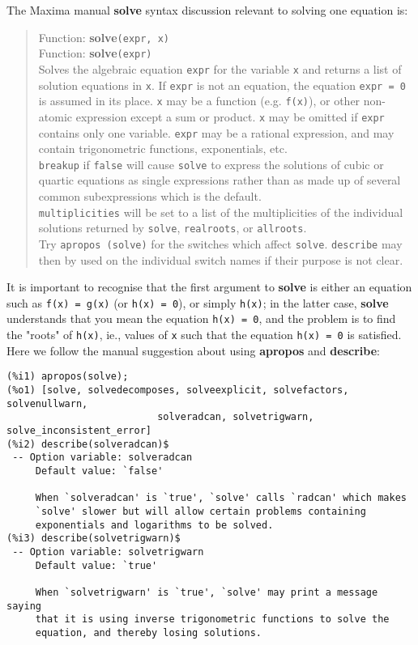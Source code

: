\documentclass[12pt]{article}
\begin{document}
The Maxima manual \textbf{solve} syntax discussion relevant to solving one equation is:
\small
\begin{quote}
Function: \textbf{solve}\verb|(expr, x) |\\
Function: \textbf{solve}\verb|(expr) |\\
Solves the algebraic equation \verb|expr| for the variable \verb|x| and returns a
  list of solution equations in \verb|x|.
If \verb|expr| is not an equation, the equation \verb|expr = 0| is assumed in
  its place.
\verb|x| may be a function (e.g. \verb|f(x)|), or other non-atomic expression
  except a sum or product.
\verb|x| may be omitted if \verb|expr| contains only one variable.
\verb|expr| may be a rational expression, and may contain trigonometric functions,
 exponentials, etc.\\
\verb|breakup| if \verb|false| will cause \verb|solve| to express the solutions
   of cubic or quartic equations as single expressions rather than as made up
   of several common subexpressions which is the default. \\
\verb|multiplicities| will be set to a list of the multiplicities of the
   individual solutions returned by \verb|solve|, \verb|realroots|, or \verb|allroots|.\\
Try \verb|apropos (solve)| for the switches which affect \verb|solve|.
\verb|describe| may then by used on the individual switch names if their purpose is not clear.
\end{quote}
\normalsize
It is important to recognise that the first argument to \textbf{solve} is either
an equation such as \verb|f(x) = g(x)| (or \verb|h(x) = 0|), or simply \verb|h(x)|; in
  the latter case, \textbf{solve} understands that you mean the equation \verb|h(x) = 0|,
and the problem is to find the "roots" of \verb|h(x)|, ie., values of \verb|x| such that 
   the equation \verb|h(x) = 0| is satisfied.\\
   
Here we follow the manual suggestion about using \textbf{apropos} and \textbf{describe}:
\small
\begin{verbatim}
(%i1) apropos(solve);
(%o1) [solve, solvedecomposes, solveexplicit, solvefactors, solvenullwarn, 
                          solveradcan, solvetrigwarn, solve_inconsistent_error]
(%i2) describe(solveradcan)$
 -- Option variable: solveradcan
     Default value: `false'

     When `solveradcan' is `true', `solve' calls `radcan' which makes
     `solve' slower but will allow certain problems containing
     exponentials and logarithms to be solved.
(%i3) describe(solvetrigwarn)$
 -- Option variable: solvetrigwarn
     Default value: `true'

     When `solvetrigwarn' is `true', `solve' may print a message saying
     that it is using inverse trigonometric functions to solve the
     equation, and thereby losing solutions.
\end{verbatim}
\normalsize
\end{document}
